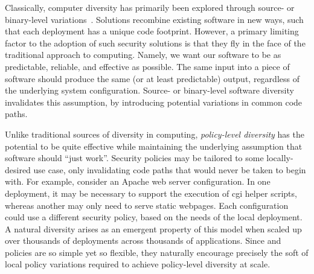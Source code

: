 Classically, computer diversity has primarily been explored through source- or
binary-level variations~\cite{somayaji2007_immunology, persaud2016_frankenssl,
neti2012_software}. Solutions recombine existing software in new ways, such that each
deployment has a unique code footprint. However, a primary limiting factor to the adoption
of such security solutions is that they fly in the face of the traditional approach to
computing. Namely, we want our software to be as predictable, reliable, and effective as
possible. The same input into a piece of software should produce the same (or at least
predictable) output, regardless of the underlying system configuration. Source- or
binary-level software diversity invalidates this assumption, by introducing potential
variations in common code paths.

Unlike traditional sources of diversity in computing, \textit{policy-level diversity} has
the potential to be quite effective while maintaining the underlying assumption that
software should \enquote{just work}. Security policies may be tailored to some
locally-desired use case, only invalidating code paths that would never be taken to begin
with. For example, consider an Apache web server configuration. In one deployment, it may
be necessary to support the execution of \gls{cgi} helper scripts, whereas another may
only need to serve static webpages. Each configuration could use a different security
policy, based on the needs of the local deployment. A natural diversity arises as an
emergent property of this model when scaled up over thousands of deployments across
thousands of applications.  Since \bpfbox{} and \bpfcontain{} policies are so simple yet
so flexible, they naturally encourage precisely the soft of local policy variations
required to achieve policy-level diversity at scale.



